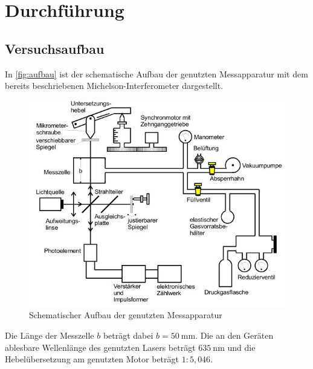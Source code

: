 \section{Durchführung}
\label{sec:Durchführung}
\subsection{Versuchsaufbau}

In \autoref{fig:aufbau} ist der schematische Aufbau der genutzten Messapparatur mit dem bereits beschriebenen Michelson-Interferometer dargestellt. 
\begin{figure}[H]
\centering
\includegraphics[width=\textwidth]{graphics/aufbau.JPG}
\caption{Schematischer Aufbau der genutzten Messapparatur \cite{anleitung}}
\label{fig:aufbau}
\end{figure}
\noindent
Die Länge der Messzelle $b$ beträgt dabei $b = \SI{50}{\milli\meter}$.
Die an den Geräten ablesbare Wellenlänge des genutzten Lasers beträgt $\SI{635}{\nano\meter}$ und die Hebelübersetzung am genutzten Motor beträgt $1:5,046$.
